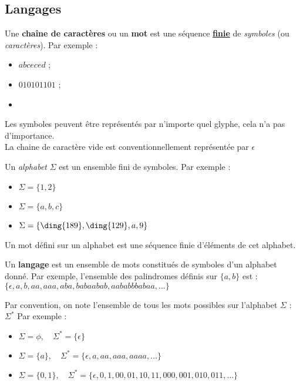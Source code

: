 
\subsection{Langages}
\label{subsec:Langages}

\begin{mydef}
    Une \textbf{chaîne de caractères} ou un \textbf{mot} est une séquence \textbf{\underline{finie}} de \emph{symboles} (ou \emph{caractères}). Par exemple :
    	\begin{itemize}
    		\item $abceced$ ;
    		\item $010101101$ ;
     		\item {}
    	\end{itemize}

    Les symboles peuvent être représentés par n'importe quel glyphe, cela n'a pas d'importance.\\
    La chaine de caractère vide est conventionnellement représentée par $\epsilon$
\end{mydef}
\begin{mydef}
    Un \emph{alphabet} $\Sigma$ est un ensemble fini de symboles. Par exemple :
    \begin{itemize}
        \item $\Sigma = \{1, 2\}$
        \item $\Sigma = \{a, b, c\}$
        \item $\Sigma = \{\ding{189},\ding{129},a,9\}$
    \end{itemize}
\end{mydef}
\begin{myrem}
    Un mot défini sur un alphabet est une séquence finie d'éléments de cet alphabet.
\end{myrem}
\begin{mydef}
    Un \textbf{langage} est un ensemble de mots constitués de symboles d'un alphabet donné. Par exemple, l'ensemble des palindromes définis sur $\{a, b\}$ est : $\{\epsilon, a, b, aa, aaa, aba, babaabab, aababbbabaa, ...\}$
\end{mydef}
\begin{myrem}
  Par convention, on note l'ensemble de tous les mots possibles sur l'alphabet $\Sigma$ :\; $\Sigma^*$
  Par exemple :
  \begin{itemize}
		\item $\Sigma = \phi,\quad \Sigma^* = \{\epsilon\}$
		\item $\Sigma = \{a\},\quad \Sigma^* = \{\epsilon, a,aa,aaa,aaaa, \ldots\}$
		\item $\Sigma = \{0,1\},\quad \Sigma^* = \{\epsilon, 0,1,00,01,10,11,000,001,010,011, \ldots\}$
  \end{itemize}
\end{myrem}

